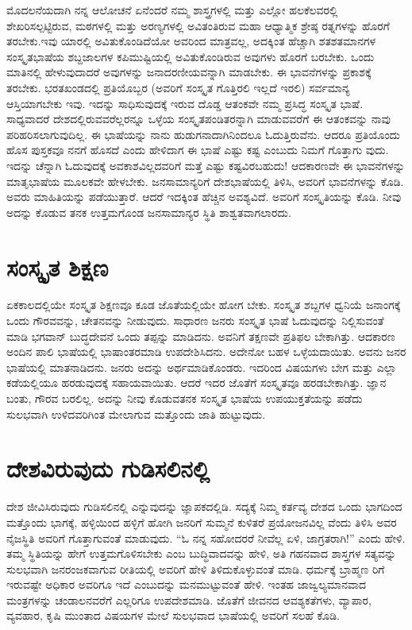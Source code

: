 ಮೊದಲನೆಯದಾಗಿ ನನ್ನ ಆಲೋಚನೆ ಏನೆಂದರೆ ನಮ್ಮ ಶಾಸ್ತ್ರಗಳಲ್ಲಿ ಮತ್ತು ಎಲ್ಲೋ ಹಲಕೆಲವರಲ್ಲಿ ಶೇಖರಿಸಲ್ಪಟ್ಟಿರುವ, ಮಠಗಳಲ್ಲಿ ಮತ್ತು ಅರಣ್ಯಗಳಲ್ಲಿ ಅವಿತಂತಿರುವ ಮಹಾ ಆಧ್ಯಾತ್ಮಿಕ ಶ್ರೇಷ್ಠ ರತ್ನಗಳನ್ನು ಹೊರಗೆ ತರಬೇಕು.ಇವು ಯಾರಲ್ಲಿ ಅವಿತುಕೊಂಡಿದೆಯೋ ಅವರಿಂದ ಮಾತ್ರವಲ್ಲ, ಅದಕ್ಕಿಂತ ಹೆಚ್ಚಾಗಿ ಶತಶತಮಾನಗಳ ಸಂಸ್ಕೃತಭಾಷೆಯ ಶಬ್ದಜಾಲಗಳ ಕಪಿಮುಷ್ಟಿಯಲ್ಲಿ ಅವಿತುಕೊಂಡಿರುವ ಅವುಗಳು ಹೊರಗೆ ಬರಬೇಕು. ಒಂದು ಮಾತಿನಲ್ಲಿ ಹೇಳುವುದಾದರೆ ಅವುಗಳನ್ನು ಜನಾದರಣೀಯವನ್ನಾಗಿ ಮಾಡಬೇಕು. ಈ ಭಾವನೆಗಳನ್ನು ಪ್ರಕಾಶಕ್ಕೆ ತರಬೇಕು. ಭರತಖಂಡದಲ್ಲಿ ಪ್ರತಿಯೊಬ್ಬರ (ಅವರಿಗೆ ಸಂಸ್ಕೃತ ಗೊತ್ತಿರಲಿ ಇಲ್ಲದೆ ಇರಲಿ) ಸರ್ವಮಾನ್ಯ ಆಸ್ತಿಯಾಗಬೇಕು ಇವು. ಇದನ್ನು ಸಾಧಿಸುವುದಕ್ಕೆ ಇರುವ ದೊಡ್ಡ ಆತಂಕವೇ ನಮ್ಮ ಪ್ರಸಿದ್ಧ ಸಂಸ್ಕೃತ ಭಾಷೆ. ಸಾಧ್ಯವಾದರೆ ದೇಶದಲ್ಲಿರುವವರೆಲ್ಲರನ್ನೂ ಒಳ್ಳೆಯ ಸಂಸ್ಕೃತಪಂಡಿತರನ್ನಾಗಿ ಮಾಡುವವರೆಗೆ ಈ ಆತಂಕವನ್ನು ನಾವು ಪರಿಹರಿಸಲಾಗುವುದಿಲ್ಲ. ಈ ಭಾಷೆಯನ್ನು ನಾನು ಹುಡುಗನಾದಾಗಿನಿಂದಲೂ ಓದುತ್ತಿರುವೆನು. ಆದರೂ ಪ್ರತಿಯೊಂದು ಹೊಸ ಪುಸ್ತಕವೂ ನನಗೆ ಹೊಸದೆ ಎಂದು ಹೇಳಿದಾಗ ಈ ಭಾಷೆ ಎಷ್ಟು ಕಷ್ಟ ಎಂಬುದು ನಿಮಗೆ ಗೊತ್ತಾಗು ವುದು. ಇದನ್ನು ಚೆನ್ನಾಗಿ ಓದುವುದಕ್ಕೆ ಅವಕಾಶವಿಲ್ಲದವರಿಗೆ ಮತ್ತೆ ಎಷ್ಟು ಕಷ್ಟವಿರಬಹುದು! ಆದಕಾರಣವೇ ಈ ಭಾವನೆಗಳನ್ನು ಮಾತೃಭಾಷೆಯ ಮೂಲಕವೇ ಹೇಳಬೇಕು. ಜನಸಾಮಾನ್ಯರಿಗೆ ದೇಶಭಾಷೆಯಲ್ಲಿ ತಿಳಿಸಿ, ಅವರಿಗೆ ಭಾವನೆಗಳನ್ನು ಕೊಡಿ. ಅವರು ಮಾಹಿತಿಯನ್ನು ಪಡೆಯುತ್ತಾರೆ. ಆದರೆ ಇದಕ್ಕಿಂತ ಹೆಚ್ಚಿನ ಅವಶ್ಯವಿದೆ. ಅವರಿಗೆ ಸಂಸ್ಕೃತಿಯನ್ನು ಕೊಡಿ. ನೀವು ಅದನ್ನು ಕೊಡುವ ತನಕ ಉತ್ತಮಗೊಂಡ ಜನಸಾಮಾನ್ಯರ ಸ್ಥಿತಿ ಶಾಶ್ವತವಾಗಲಾರದು.


\section{ಸಂಸ್ಕೃತ ಶಿಕ್ಷಣ}

ಏಕಕಾಲದಲ್ಲಿಯೇ ಸಂಸ್ಕೃತ ಶಿಕ್ಷಣವೂ ಕೂಡ ಜೊತೆಯಲ್ಲಿಯೇ ಹೋಗ ಬೇಕು. ಸಂಸ್ಕೃತ ಶಬ್ದಗಳ ಧ್ವನಿಯೆ ಜನಾಂಗಕ್ಕೆ ಒಂದು ಗೌರವವನ್ನು, ಚೇತನವನ್ನು ನೀಡುವುದು. ಸಾಧಾರಣ ಜನರು ಸಂಸ್ಕೃತ ಭಾಷೆ ಓದುವುದನ್ನು ನಿಲ್ಲಿಸುವಂತೆ ಮಾಡಿ ಭಗವಾನ್ ಬುದ್ಧದೇವನೆ ಒಂದು ತಪ್ಪನ್ನು ಮಾಡಿದನು. ಅವನಿಗೆ ತಕ್ಷಣವೇ ಪ್ರತಿಫಲ ಬೇಕಾಗಿತ್ತು. ಆದಕಾರಣ ಅಂದಿನ ಪಾಲಿ ಭಾಷೆಯಲ್ಲಿ ಭಾಷಾಂತರಮಾಡಿ ಉಪದೇಶಿಸಿದನು. ಅದೇನೋ ಬಹಳ ಒಳ್ಳೆಯದಾಯಿತು. ಅವನು ಜನರ ಭಾಷೆಯಲ್ಲಿ ಮಾತನಾಡಿದನು. ಜನರು ಅದನ್ನು ಅರ್ಥಮಾಡಿಕೊಂಡರು. ಇದರಿಂದ ವಿಷಯಗಳು ಬೇಗ ಮತ್ತು ಎಲ್ಲಾ ಕಡೆಯಲ್ಲಿಯೂ ಹರಡುವುದಕ್ಕೆ ಸಹಾಯವಾಯಿತು. ಆದರೆ ಇದರ ಜೊತೆಗೆ ಸಂಸ್ಕೃತವೂ ಹರಡಬೇಕಾಗಿತ್ತು. ಜ್ಞಾನ ಬಂತು, ಗೌರವ ಬರಲಿಲ್ಲ. ಅದನ್ನು ನೀವು ಕೊಡುವತನಕ ಸಂಸ್ಕೃತ ಭಾಷೆಯ ಉಪಯುಕ್ತತೆಯನ್ನು ಪಡೆದು ಸುಲಭವಾಗಿ ಉಳಿದವರಿಗಿಂತ ಮೇಲಾಗುವ ಮತ್ತೊಂದು ಜಾತಿ ಹುಟ್ಟುವುದು.


\section{ದೇಶವಿರುವುದು ಗುಡಿಸಲಿನಲ್ಲಿ}

ದೇಶ ಜೀವಿಸಿರುವುದು ಗುಡಿಸಲಿನಲ್ಲಿ ಎನ್ನುವುದನ್ನು ಜ್ಞಾಪಕದಲ್ಲಿಡಿ. ಸದ್ಯಕ್ಕೆ ನಿಮ್ಮ ಕರ್ತವ್ಯ ದೇಶದ ಒಂದು ಭಾಗದಿಂದ ಮತ್ತೊಂದು ಭಾಗಕ್ಕೆ, ಹಳ್ಳಿಯಿಂದ ಹಳ್ಳಿಗೆ ಹೋಗಿ ಜನರಿಗೆ ಸುಮ್ಮನೆ ಕುಳಿತರೆ ಪ್ರಯೋಜನವಿಲ್ಲ ವೆಂದು ತಿಳಿಸಿ ಅವರ ನೈಜಸ್ಥಿತಿ ಅವರಿಗೆ ಗೊತ್ತಾಗುವಂತೆ ಮಾಡುವುದು. “ಓ ನನ್ನ ಸಹೋದರರೆ ನೀವೆಲ್ಲ ಏಳಿ, ಜಾಗ್ರತರಾಗಿ!” ಎಂದು ಹೇಳಿ. ತಮ್ಮ ಸ್ಥಿತಿಯನ್ನು ಹೇಗೆ ಉತ್ತಮಗೊಳಿಸಬೇಕು ಎಂಬ ಬುದ್ಧಿವಾದವನ್ನು ಹೇಳಿ, ಅತಿ ಗಹನವಾದ ಶಾಸ್ತ್ರಗಳ ಸತ್ಯವನ್ನು ಸುಲಭವಾಗಿ ಜನರಂಜಕವಾಗುವ ರೀತಿಯಲ್ಲಿ ಅವರಿಗೆ ಹೇಳಿ ತಿಳಿದುಕೊಳ್ಳುವಂತೆ ಮಾಡಿ. ಧರ್ಮಕ್ಕೆ ಬ್ರಾಹ್ಮಣ ರಿಗೆ ಇರುವಷ್ಟೇ ಅಧಿಕಾರ ಅವರಿಗೂ ಇದೆ ಎಂಬುದನ್ನು ಮನಮುಟ್ಟುವಂತೆ ಹೇಳಿ. ಇಂತಹ ಜಾಜ್ವಲ್ಯಮಾನವಾದ ಮಂತ್ರಗಳನ್ನು ಚಂಡಾಲನವರೆಗೆ ಎಲ್ಲರಿಗೂ ಉಪದೇಶಮಾಡಿ. ಜೊತೆಗೆ ಜೀವನದ ಆವಶ್ಯಕತೆಗಳು, ವ್ಯಾಪಾರ, ವ್ಯವಹಾರ, ಕೃಷಿ ಮುಂತಾದ ವಿಷಯಗಳ ಮೇಲೆ ಸುಲಭವಾದ ಭಾಷೆಯಲ್ಲಿ ಅವರಿಗೆ ಸಲಹೆ ಕೊಡಿ.



